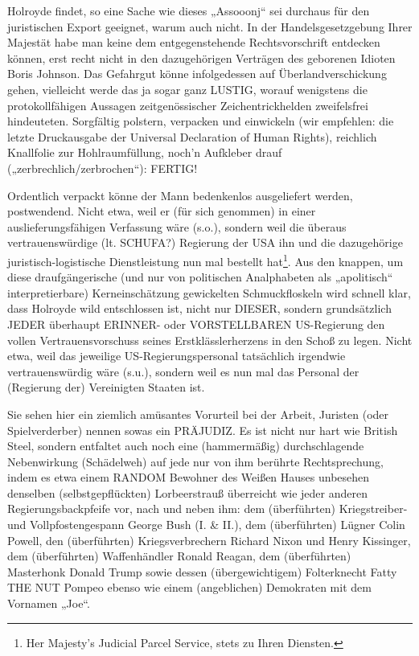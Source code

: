 \begin{multicols}{2}
Holroyde findet, so eine Sache wie dieses „Assooonj“
sei durchaus für den juristischen Export geeignet, warum auch nicht. In der Handelsgesetzgebung Ihrer Majestät habe man keine dem entgegenstehende Rechtsvorschrift entdecken können, erst recht nicht in den
dazugehörigen Verträgen des geborenen Idioten Boris Johnson. Das Gefahrgut könne infolgedessen auf Überlandverschickung gehen, vielleicht werde das ja sogar
ganz LUSTIG, worauf wenigstens die protokollfähigen
Aussagen zeitgenössischer Zeichentrickhelden zweifelsfrei hindeuteten. Sorgfältig polstern, verpacken und
einwickeln (wir empfehlen: die letzte Druckausgabe der
Universal Declaration of Human Rights), reichlich Knallfolie zur Hohlraumfüllung, noch’n Aufkleber drauf („zerbrechlich/zerbrochen“): FERTIG!

Ordentlich verpackt könne der Mann bedenkenlos ausgeliefert werden, postwendend. Nicht etwa, weil er (für
sich genommen) in einer auslieferungsfähigen Verfassung wäre (s.o.), sondern weil die überaus vertrauenswürdige (lt. SCHUFA?) Regierung der USA ihn und die
dazugehörige juristisch-logistische Dienstleistung nun
mal bestellt hat\footnote[29]{Her Majesty’s Judicial Parcel Service, stets zu Ihren Diensten.}. 
Aus den knappen, um diese draufgängerische (und nur von politischen Analphabeten
als „apolitisch“ interpretierbare) Kerneinschätzung gewickelten Schmuckfloskeln wird schnell klar, dass Holroyde wild entschlossen ist, nicht nur DIESER, sondern
grundsätzlich JEDER überhaupt ERINNER- oder VORSTELLBAREN US-Regierung den vollen Vertrauensvorschuss seines Erstklässlerherzens in den Schoß zu legen.
Nicht etwa, weil das jeweilige US-Regierungspersonal
tatsächlich irgendwie vertrauenswürdig wäre (s.u.), sondern weil es nun mal das Personal der (Regierung der)
Vereinigten Staaten ist.

Sie sehen hier ein ziemlich amüsantes Vorurteil bei der
Arbeit, Juristen (oder Spielverderber) nennen sowas ein
PRÄJUDIZ. Es ist nicht nur hart wie British Steel, sondern
entfaltet auch noch eine (hammermäßig) durchschlagende Nebenwirkung (Schädelweh) auf jede nur von ihm
berührte Rechtsprechung, indem es etwa einem RANDOM Bewohner des Weißen Hauses unbesehen denselben (selbstgepflückten) Lorbeerstrauß überreicht wie jeder anderen Regierungsbackpfeife vor, nach und neben
ihm: dem (überführten) Kriegstreiber- und Vollpfostengespann George Bush (I. \& II.), dem (überführten) Lügner Colin Powell, den (überführten) Kriegsverbrechern
Richard Nixon und Henry Kissinger, dem (überführten)
Waffenhändler Ronald Reagan, dem (überführten) Masterhonk Donald Trump sowie dessen (übergewichtigem)
Folterknecht Fatty THE NUT Pompeo ebenso wie einem
(angeblichen) Demokraten mit dem Vornamen „Joe“.


\end{multicols}
